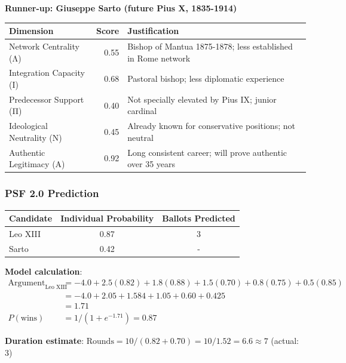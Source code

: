 \textbf{Runner-up: Giuseppe Sarto (future Pius X, 1835-1914)}

\begin{center}
\begin{tabular}{lrp{4cm}}
\toprule
\textbf{Dimension} & \textbf{Score} & \textbf{Justification} \\
\midrule
Network Centrality (Λ) & 0.55 & Bishop of Mantua 1875-1878; less established in Rome network \\
Integration Capacity (Ι) & 0.68 & Pastoral bishop; less diplomatic experience \\
Predecessor Support (Π) & 0.40 & Not specially elevated by Pius IX; junior cardinal \\
Ideological Neutrality (Ν) & 0.45 & Already known for conservative positions; not neutral \\
Authentic Legitimacy (Α) & 0.92 & Long consistent career; will prove authentic over 35 years \\
\bottomrule
\end{tabular}
\end{center}

\subsubsection{PSF 2.0 Prediction}

\begin{center}
\begin{tabular}{lcc}
\toprule
\textbf{Candidate} & \textbf{Individual Probability} & \textbf{Ballots Predicted} \\
\midrule
Leo XIII & 0.87 & 3 \\
Sarto & 0.42 & - \\
\bottomrule
\end{tabular}
\end{center}

\textbf{Model calculation}:
\begin{equation}
\begin{split}
\text{Argument}_{\text{Leo XIII}} &= -4.0 + 2.5(0.82) + 1.8(0.88) + 1.5(0.70) + 0.8(0.75) + 0.5(0.85) \\
&= -4.0 + 2.05 + 1.584 + 1.05 + 0.60 + 0.425 \\
&= 1.71 \\
P(\text{wins}) &= 1 / (1 + e^{-1.71}) = 0.87
\end{split}
\end{equation}

\textbf{Duration estimate}: $\text{Rounds} = 10 / (0.82 + 0.70) = 10 / 1.52 = 6.6 \approx 7$ (actual: 3)

